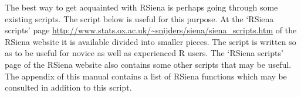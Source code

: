 \documentclass[a4paper,fleqn,11pt]{article}
\newcommand{\+}{\, + \,}
\newcommand{\R}{{\sf R }}
\newcommand{\RS}{{\sf RSiena }}
\begin{document}
{The best way to get acquainted with \RS is perhaps
going through some existing scripts.
The script  below is useful for this purpose.
At the `RSiena scripts' page
\url{http://www.stats.ox.ac.uk/~snijders/siena/siena_scripts.htm}
 of the \RS website
it is available divided into smaller pieces.
The script is written so as to be useful for novice
as well as experienced \R users.
The `RSiena scripts' page of the \RS website
also contains some other scripts that may be useful.
The appendix of this manual contains a list of \RS functions which may be consulted
in addition to this script.

\newpage
{\footnotesize

\newpage




}

}
\end{document}
